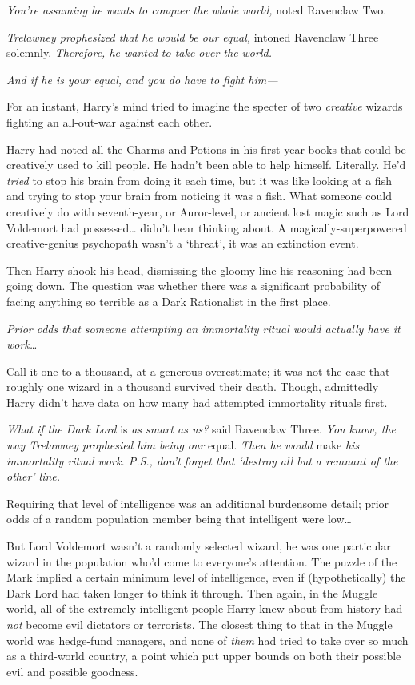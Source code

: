 \emph{You're assuming he wants to conquer the whole world,} noted Ravenclaw Two.

\emph{Trelawney prophesized that he would be our equal,} intoned Ravenclaw 
Three solemnly. \emph{Therefore, he wanted to take over the world.}

\emph{And if he is your equal, and you do have to fight him---}

For an instant, Harry's mind tried to imagine the specter of two 
\emph{creative} wizards fighting an all-out-war against each other.

Harry had noted all the Charms and Potions in his first-year books that could 
be creatively used to kill people. He hadn't been able to help himself. 
Literally. He'd \emph{tried} to stop his brain from doing it each time, but it 
was like looking at a fish and trying to stop your brain from noticing it was a 
fish. What someone could creatively do with seventh-year, or Auror-level, or 
ancient lost magic such as Lord Voldemort had possessed{\ldots} didn't bear 
thinking about. A magically-superpowered creative-genius psychopath wasn't a 
`threat', it was an extinction event.

Then Harry shook his head, dismissing the gloomy line his reasoning had been 
going down. The question was whether there was a significant probability of 
facing anything so terrible as a Dark Rationalist in the first place.

\emph{Prior odds that someone attempting an immortality ritual would actually 
have it work{\ldots}}

Call it one to a thousand, at a generous overestimate; it was not the case that 
roughly one wizard in a thousand survived their death. Though, admittedly Harry 
didn't have data on how many had attempted immortality rituals first.

\emph{What if the Dark Lord} is \emph{as smart as us?} said Ravenclaw Three. 
\emph{You know, the way Trelawney prophesied him being our} equal. \emph{Then 
he would} make \emph{his immortality ritual work. P.S., don't forget that 
`destroy all but a remnant of the other' line.}

Requiring that level of intelligence was an additional burdensome detail; prior 
odds of a random population member being that intelligent were low{\ldots}

But Lord Voldemort wasn't a randomly selected wizard, he was one particular 
wizard in the population who'd come to everyone's attention. The puzzle of the 
Mark implied a certain minimum level of intelligence, even if (hypothetically) 
the Dark Lord had taken longer to think it through. Then again, in the Muggle 
world, all of the extremely intelligent people Harry knew about from history 
had \emph{not} become evil dictators or terrorists. The closest thing to that 
in the Muggle world was hedge-fund managers, and none of \emph{them} had tried 
to take over so much as a third-world country, a point which put upper bounds 
on both their possible evil and possible goodness.

